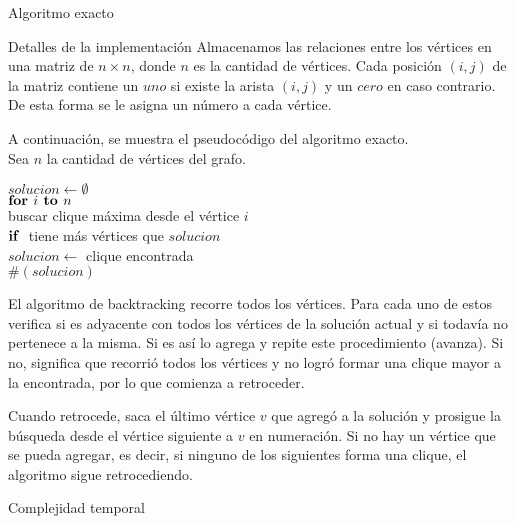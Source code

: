\begin{section}{Algoritmo exacto}
\begin{subsection}{Detalles de la implementación}
			Almacenamos las relaciones entre los vértices en una matriz de $n \times n$, donde $n$ es la cantidad de vértices. Cada posición $(i,j)$ de la matriz contiene un $uno$ si existe la arista $(i,j)$ y un $cero$ en caso contrario. De esta forma se le asigna un número a cada vértice.\Pa

			A continuación, se muestra el pseudocódigo del algoritmo exacto.\\

			Sea $n$ la cantidad de vértices del grafo.\\

			\begin{pseudo}
				\tab $solucion \leftarrow \emptyset$\\
				\tab $\textbf{for } i \textbf{ to } n$\\
				\tab \tab buscar clique máxima desde el vértice $i$\\
				\tab \tab $\textbf{if }$ tiene más vértices que $solucion$\\
				\tab \tab \tab $solucion \leftarrow $ clique encontrada\\
				\RET $\#(solucion)$\\
			\end{pseudo}
			
			El algoritmo de backtracking recorre todos los vértices. Para cada uno de estos verifica si es adyacente con todos los vértices de la solución actual y si todavía no pertenece a la misma. Si es así lo agrega y repite este procedimiento (avanza). Si no, significa que recorrió todos los vértices y no logró formar una clique mayor a la encontrada, por lo que comienza a retroceder.

			Cuando retrocede, saca el último vértice $v$ que agregó a la solución y prosigue la búsqueda desde el vértice siguiente a $v$ en numeración. Si no hay un vértice que se pueda agregar, es decir, si ninguno de los siguientes forma una clique, el algoritmo sigue retrocediendo.
			
		\end{subsection}


		\newpage
		
		\begin{subsection}{Complejidad temporal}


\end{subsection}
\end{section}
